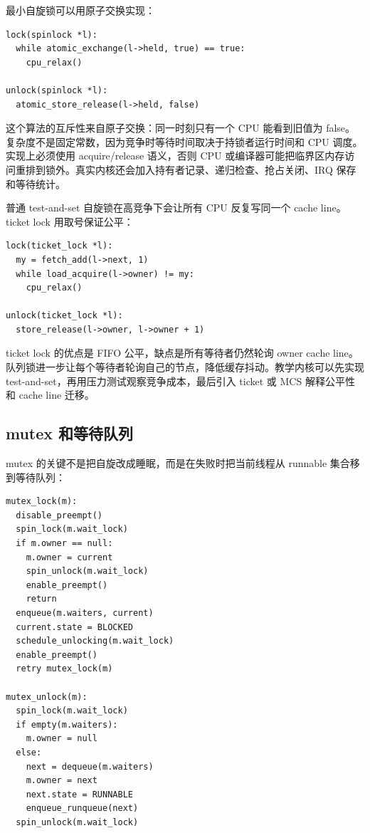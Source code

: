 最小自旋锁可以用原子交换实现：

\begin{lstlisting}
lock(spinlock *l):
  while atomic_exchange(l->held, true) == true:
    cpu_relax()

unlock(spinlock *l):
  atomic_store_release(l->held, false)
\end{lstlisting}

这个算法的互斥性来自原子交换：同一时刻只有一个 CPU 能看到旧值为 false。复杂度不是固定常数，因为竞争时等待时间取决于持锁者运行时间和 CPU 调度。实现上必须使用 acquire/release 语义，否则 CPU 或编译器可能把临界区内存访问重排到锁外。真实内核还会加入持有者记录、递归检查、抢占关闭、IRQ 保存和等待统计。

普通 test-and-set 自旋锁在高竞争下会让所有 CPU 反复写同一个 cache line。ticket lock 用取号保证公平：

\begin{lstlisting}
lock(ticket_lock *l):
  my = fetch_add(l->next, 1)
  while load_acquire(l->owner) != my:
    cpu_relax()

unlock(ticket_lock *l):
  store_release(l->owner, l->owner + 1)
\end{lstlisting}

ticket lock 的优点是 FIFO 公平，缺点是所有等待者仍然轮询 owner cache line。队列锁进一步让每个等待者轮询自己的节点，降低缓存抖动。教学内核可以先实现 test-and-set，再用压力测试观察竞争成本，最后引入 ticket 或 MCS 解释公平性和 cache line 迁移。

\subsection{mutex 和等待队列}

mutex 的关键不是把自旋改成睡眠，而是在失败时把当前线程从 runnable 集合移到等待队列：

\begin{lstlisting}
mutex_lock(m):
  disable_preempt()
  spin_lock(m.wait_lock)
  if m.owner == null:
    m.owner = current
    spin_unlock(m.wait_lock)
    enable_preempt()
    return
  enqueue(m.waiters, current)
  current.state = BLOCKED
  schedule_unlocking(m.wait_lock)
  enable_preempt()
  retry mutex_lock(m)

mutex_unlock(m):
  spin_lock(m.wait_lock)
  if empty(m.waiters):
    m.owner = null
  else:
    next = dequeue(m.waiters)
    m.owner = next
    next.state = RUNNABLE
    enqueue_runqueue(next)
  spin_unlock(m.wait_lock)
\end{lstlisting}

